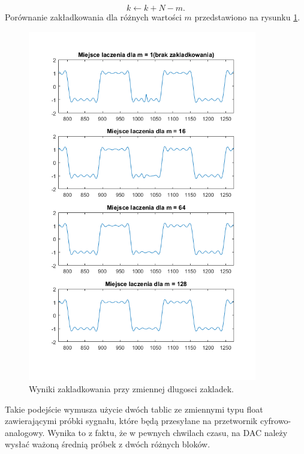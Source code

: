 \begin{equation} \label{equ:sub_4}
k \gets k + N - m.
\end{equation}
Porównanie zakładkowania dla różnych wartości $m$ przedstawiono na rysunku  \ref{rys:sub_overlaps}.
\begin{figure}[H]
	\centering
	\includegraphics[width=10cm]{grafiki/sub_overlaps}
	\captionsetup{justification=centering}
	\caption{Wyniki zakladkowania przy zmiennej dlugosci zakladek.}
	\label{rys:sub_overlaps}
\end{figure}

Takie podejście wymusza użycie dwóch tablic ze zmiennymi typu float zawierającymi próbki sygnału, które będą przesyłane na przetwornik cyfrowo-analogowy. Wynika to z faktu, że w pewnych chwilach czasu, na DAC należy wysłać ważoną średnią próbek z dwóch różnych bloków. 

